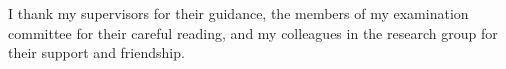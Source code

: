I thank my supervisors for their guidance, the members of my examination committee for their
careful reading, and my colleagues in the research group for their support and friendship.
